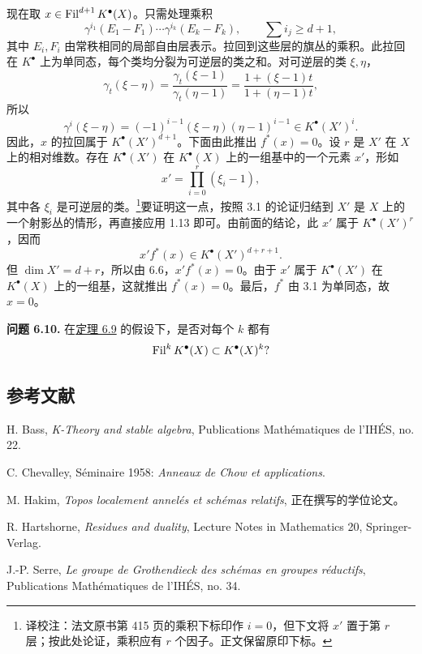 现在取 \(x\in \operatorname{Fil}^{d+1}K^\bullet(X)\)。只需处理乘积
\[
  \gamma^{i_1}(E_1-F_1)\cdots\gamma^{i_k}(E_k-F_k),
  \qquad \sum i_j\geq d+1,
\]
其中 \(E_i,F_i\) 由常秩相同的局部自由层表示。拉回到这些层的旗丛的乘积。此拉回在 \(K^\bullet\) 上为单同态，每个类均分裂为可逆层的类之和。对可逆层的类 \(\xi,\eta\)，
\[
  \gamma_t(\xi-\eta)
  =\frac{\gamma_t(\xi-1)}{\gamma_t(\eta-1)}
  =\frac{1+(\xi-1)t}{1+(\eta-1)t},
\]
所以
\[
  \gamma^i(\xi-\eta)=(-1)^{i-1}(\xi-\eta)(\eta-1)^{i-1}\in K^\bullet(X')^i.
\]
因此，\(x\) 的拉回属于 \(K^\bullet(X')^{d+1}\)。下面由此推出 \(f^*(x)=0\)。设 \(r\) 是 \(X'\) 在 \(X\) 上的相对维数。存在 \(K^\bullet(X')\) 在 \(K^\bullet(X)\) 上的一组基中的一个元素 \(x'\)，形如
\[
 x'=\prod_{i=0}^r(\xi_i-1),
\]
其中各 \(\xi_i\) 是可逆层的类。\footnote{译校注：法文原书第 415 页的乘积下标印作 \(i=0\)，但下文将 \(x'\) 置于第 \(r\) 层；按此处论证，乘积应有 \(r\) 个因子。正文保留原印下标。}要证明这一点，按照 3.1 的论证归结到 \(X'\) 是 \(X\) 上的一个射影丛的情形，再直接应用 1.13 即可。由前面的结论，此 \(x'\) 属于 \(K^\bullet(X')^r\)，因而
\[
 x'f^*(x)\in K^\bullet(X')^{d+r+1}.
\]
但 \(\dim X'=d+r\)，所以由 6.6，\(x'f^*(x)=0\)。由于 \(x'\) 属于 \(K^\bullet(X')\) 在 \(K^\bullet(X)\) 上的一组基，这就推出 \(f^*(x)=0\)。最后，\(f^*\) 由 3.1 为单同态，故 \(x=0\)。

\textbf{问题 6.10.} 在\hyperlink{sga6.e06.thm.6-9}{定理 6.9} 的假设下，是否对每个 \(k\) 都有
\[
  \operatorname{Fil}^kK^\bullet(X)\subset K^\bullet(X)^k?
\]

\subsection*{参考文献}
\begin{enumerate}[label={\textup{[\arabic*]}}]
\item H. Bass, \emph{K-Theory and stable algebra}, Publications Mathématiques de l'IHÉS, no. 22.
\item C. Chevalley, Séminaire 1958: \emph{Anneaux de Chow et applications}.
\item M. Hakim, \emph{Topos localement annelés et schémas relatifs}, 正在撰写的学位论文。
\item R. Hartshorne, \emph{Residues and duality}, Lecture Notes in Mathematics 20, Springer-Verlag.
\item J.-P. Serre, \emph{Le groupe de Grothendieck des schémas en groupes réductifs}, Publications Mathématiques de l'IHÉS, no. 34.
\end{enumerate}



\providecommand{\Kosz}{\mathrm K}
\providecommand{\Proj}{\operatorname{Proj}}
\providecommand{\Sym}{\operatorname{Sym}}
\providecommand{\gr}{\operatorname{gr}}
\providecommand{\Tor}{\operatorname{Tor}}
\providecommand{\Spec}{\operatorname{Spec}}
\providecommand{\Imf}{\operatorname{Im}}
\providecommand{\Ker}{\operatorname{Ker}}
\providecommand{\Id}{\operatorname{Id}}
\providecommand{\rad}{\operatorname{rad}}
\providecommand{\cO}{\mathcal O}
\providecommand{\cS}{\mathcal S}
\providecommand{\cJ}{\mathcal J}
\providecommand{\cN}{\mathcal N}
\providecommand{\bfP}{\mathbf P}
\providecommand{\bfA}{\mathbf A}


